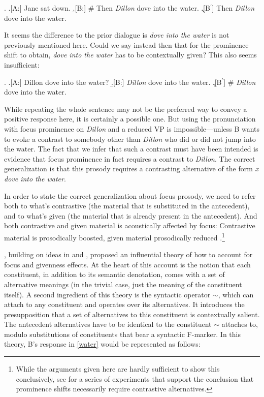 \documentclass[preprint,review,12pt,authoryear,times]{elsarticle}
\begin{document}
\ex.
\a.[A:] Jane sat down. 
\b.[B:] \# Then {\em Dillon} dove into the water.
\c.[B$^\prime$] Then {\em Dillon} dove into the water.

It seems the difference to the prior dialogue is {\em dove into the water} is not previously mentioned here. Could we say instead then that for the prominence shift to obtain, {\em dove into the water} has to be contextually given? This also seems insufficient:

\ex.  
\a.[A:] Dillon dove into the water?
\b.[B:] {\em Dillon} dove into the water.
\c.[B$^\prime$] \# {\em Dillon} dove into the water.

While repeating the whole sentence may not be the preferred way to convey a positive response here, it is certainly a possible one. But using the pronunciation with focus prominence on {\em Dillon} and a reduced VP is impossible---unless B wants to evoke a contrast to somebody other than {\em Dillon} who did or did not jump into the water. The fact that we infer that such a contrast must have been intended is evidence that focus prominence in fact requires a contrast to {\em Dillon}. The correct generalization is that this prosody requires a contrasting alternative of the form {\em x dove into the water}. 

In order to state the correct generalization about focus prosody, we need to refer both to what's contrastive (the material that is substituted in the antecedent), and to what's given (the material that is already present in the antecedent). And both contrastive and given material is acoustically affected by focus: Contrastive material is prosodically boosted, given material prosodically reduced \citep[][i.a.]{eady86,breenetal10}.\footnote{While the arguments given here are hardly sufficient to show this conclusively, see \citet{klassenwagner17} for a series of experiments that support the conclusion that prominence shifts necessarily require contrastive alternatives.} 

\citet{rooth85,rooth92b}, building on ideas in \citet{choms71} and \citet{jacke72}, proposed an influential theory of how to account for focus and givenness effects. At the heart of this account is the notion that each constituent, in addition to its semantic denotation, comes with a set of alternative meanings (in the trivial case, just the meaning of the constituent itself).
A second ingredient of this theory is the syntactic operator $\sim$, which can attach to any constituent and operates over its alternatives. It introduces the presupposition that a set of alternatives to this constituent is contextually salient. The antecedent alternatives have to be identical to the constituent $\sim$ attaches to, modulo substitutions of constituents that bear a syntactic F-marker. In this theory, B's response in \ref{water} would be represented as follows:
\end{document}
